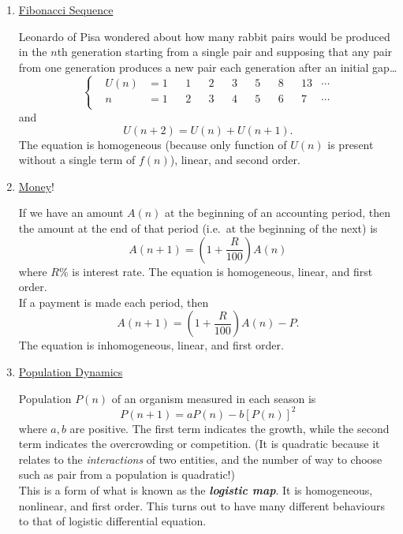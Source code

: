 \documentclass[12pt]{report}
\theoremstyle{definition}
\begin{document}
\begin{ex}
    \;

    \begin{enumerate}[label = (\alph*)]
        \item \underline{Fibonacci Sequence}

            Leonardo of Pisa wondered about how many rabbit pairs would be produced in the $n$th generation
            starting from a single pair and supposing that any pair from one generation produces a new pair
            each generation after an initial gap\ldots\[
                \left\{\begin{align*}
                    & U(n) & = 1 && 1 && 2 && 3 && 5 && 8 && 13 & \cdots \\
                    & n    & = 1 && 2 && 3 && 4 && 5 && 6 && 7  & \cdots \\
                \end{align*}\right.
            \]and\[
                    U(n + 2) = U(n) + U(n + 1).
                \]The equation is homogeneous (because only function of $U(n)$ is present 
                without a single term of $f(n)$), linear, and second order.

            \item \underline{Money}!

                If we have an amount $A(n)$ at the beginning of an accounting period,
                then the amount at the end of that period (i.e.\ at the beginning of the next)
                is \[
                    A(n+1) = (1 + \frac{R}{100}) A(n)
                \]where $R\%$ is interest rate.
                The equation is homogeneous, linear, and first order.
                \smallskip
                \\If a payment is made each period, then\[
                    A(n + 1) = (1 + \frac{R}{100}) A(n) - P.
                \]The equation is inhomogeneous, linear, and first order.

            \item \underline{Population Dynamics}

                Population $P(n)$ of an organism measured in each season is\[
                    P(n+1) = aP(n) - b{[P(n)]}^{2}
                \]where $a, b$ are positive. The first term indicates the growth,
                while the second term indicates the overcrowding or competition.
                (It is quadratic because it relates to the \emph{interactions} of two entities, 
                and the number of way to choose such as pair from a population is quadratic!)
                \smallskip
                \\This is a form of what is known as the \textbf{\emph{logistic map}}.
                It is homogeneous, nonlinear, and first order.
                This turns out to have many different behaviours to that of logistic differential equation.
    \end{enumerate}
\end{ex}
\end{document}
